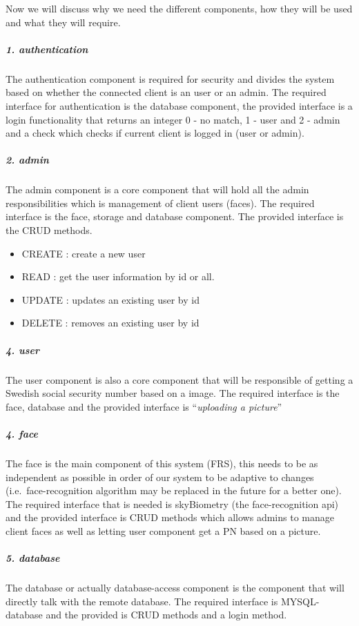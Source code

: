 \documentclass[a4paper,11pt]{article}
\begin{document}
Now we will discuss why we need the different components, how they will
be used and what they will require.

\subparagraph{1. authentication}\label{authentication}

The authentication component is required for security and divides the
system based on whether the connected client is an user or an admin. The
required interface for authentication is the database component, the
provided interface is a login functionality that returns an integer 0 -
no match, 1 - user and 2 - admin and a check which checks if current
client is logged in (user or admin).

\subparagraph{2. admin}\label{admin}

The admin component is a core component that will hold all the admin
responsibilities which is management of client users (faces). The
required interface is the face, storage and database component. The
provided interface is the CRUD methods.

\begin{itemize}
\item
  CREATE : create a new user
\item
  READ : get the user information by id or all.
\item
  UPDATE : updates an existing user by id
\item
  DELETE : removes an existing user by id
\end{itemize}

\subparagraph{4. user}\label{user}

The user component is also a core component that will be responsible of
getting a Swedish social security number based on a image. The required
interface is the face, database and the provided interface is
``\emph{uploading a picture}''

\subparagraph{4. face}\label{face}

The face is the main component of this system (FRS), this needs to be as
independent as possible in order of our system to be adaptive to changes
(i.e.~face-recognition algorithm may be replaced in the future for a
better one). The required interface that is needed is skyBiometry (the
face-recognition api) and the provided interface is CRUD methods which
allows admins to manage client faces as well as letting user component
get a PN based on a picture.

\subparagraph{5. database}\label{database}

The database or actually database-access component is the component that
will directly talk with the remote database. The required interface is
MYSQL-database and the provided is CRUD methods and a login method.
\end{document}

